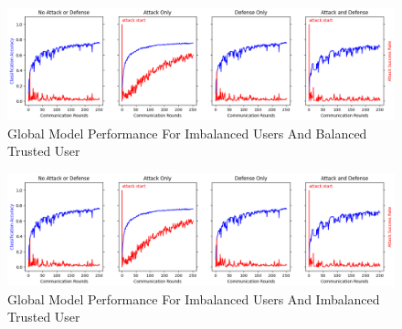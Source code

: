 \documentclass{article} %
\begin{document}
\begin{figure}[H]
    \centering
    \includegraphics[width=\textwidth]{01_trusted/centralized/alpha1--alpha_val1/visuals/accuracy--n_malicious1--m_start1.png}
    \caption{Global Model Performance For Imbalanced Users And Balanced Trusted User}
    \label{fig:centralized--alpha1--alpha_val10000--accuracy--n_malicious1--m_start1}
\end{figure} 

\begin{figure}[H]
    \centering
    \includegraphics[width=\textwidth]{01_trusted/centralized/alpha1--alpha_val1/visuals/accuracy--n_malicious1--m_start1.png}
    \caption{Global Model Performance For Imbalanced Users And Imbalanced Trusted User}
    \label{fig:centralized--alpha1--alpha_val1--accuracy--n_malicious1--m_start1}
\end{figure} 
\end{document}

